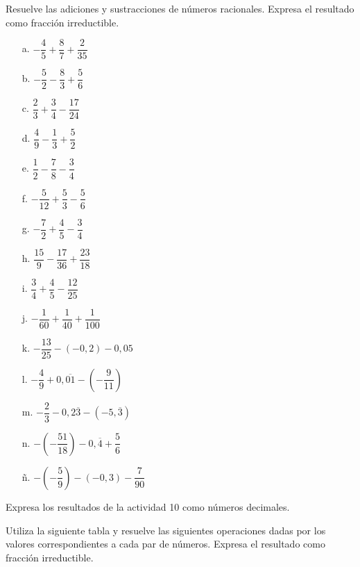 \documentclass[spanish,letterpaper, 11pt, addpoints, answers]{exam}
\begin{document}
\begin{questions}
\begin{multicols}{2}
  \end{multicols}

  \question Resuelve las adiciones y sustracciones de números racionales. Expresa el resultado como fracción irreductible.
  \begin{multicols}{2}
  \begin{itemize}
    \item[a.] $-\dfrac{4}{5}+\dfrac{8}{7}+\dfrac{2}{35}$
    \item[b.] $-\dfrac{5}{2}-\dfrac{8}{3}+\dfrac{5}{6}$
    \item[c.] $\dfrac{2}{3}+\dfrac{3}{4}-\dfrac{17}{24}$
    \item[d.] $\dfrac{4}{9}-\dfrac{1}{3}+\dfrac{5}{2}$
    \item[e.] $\dfrac{1}{2}-\dfrac{7}{8}-\dfrac{3}{4}$
    \item[f.] $-\dfrac{5}{12}+\dfrac{5}{3}-\dfrac{5}{6}$
    \item[g.] $-\dfrac{7}{2}+\dfrac{4}{5}-\dfrac{3}{4}$
    \item[h.] $\dfrac{15}{9}-\dfrac{17}{36}+\dfrac{23}{18}$
    \item[i.] $\dfrac{3}{4}+\dfrac{4}{5}-\dfrac{12}{25}$
    \item[j.] $-\dfrac{1}{60}+\dfrac{1}{40}+\dfrac{1}{100}$
    \item[k.] $-\dfrac{13}{25}-(-0{,}2)-0{,}05$
    \item[l.] $-\dfrac{4}{9}+0{,}\overline{01}-\left(-\dfrac{9}{11}\right)$
    \item[m.] $-\dfrac{2}{3}-0{,}2\overline{3}-\left(-5{,}\overline{3}\right)$
    \item[n.] $-\left(-\dfrac{51}{18}\right)-0{,}\overline{4}+\dfrac{5}{6}$
    \item[ñ.] $-\left(-\dfrac{5}{9}\right)-\left(-0{,}3\right)-\dfrac{7}{90}$

  \end{itemize}
\end{multicols}

  \question Expresa los resultados de la actividad 10 como números decimales.

  \question Utiliza la siguiente tabla y resuelve las siguientes operaciones dadas por los valores correspondientes a cada par de números. Expresa el resultado como fracción irreductible.


\end{questions}
\end{document}
